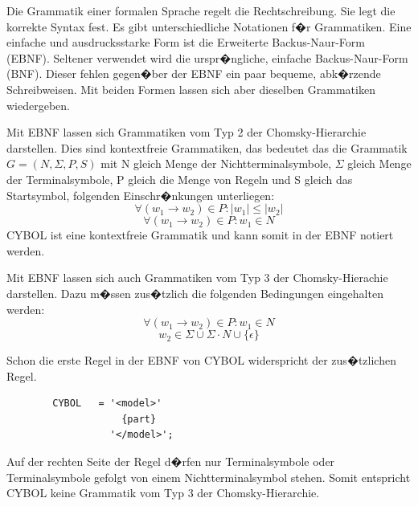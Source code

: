       Die Grammatik einer formalen Sprache regelt die Rechtschreibung. Sie legt die korrekte 
      Syntax fest. Es gibt unterschiedliche Notationen f�r Grammatiken. Eine 
      einfache und ausdrucksstarke Form ist die Erweiterte 
      Backus-Naur-Form (EBNF). Seltener verwendet wird die urspr�ngliche, 
      einfache Backus-Naur-Form (BNF). Dieser fehlen gegen�ber der EBNF ein paar 
      bequeme, abk�rzende Schreibweisen. Mit beiden Formen lassen sich aber dieselben 
      Grammatiken wiedergeben.
      
      Mit EBNF lassen sich Grammatiken vom Typ 2 der Chomsky-Hierarchie darstellen.
      Dies sind kontextfreie Grammatiken, das bedeutet das die Grammatik 
      $G=\left( N, \Sigma, P, S \right)$ mit N gleich Menge der Nichtterminalsymbole,
      $\Sigma$ gleich Menge der Terminalsymbole, P gleich die Menge von Regeln und 
      S gleich das Startsymbol, folgenden Einschr�nkungen unterliegen:
      \begin{displaymath}      
        \forall ( w_1 \rightarrow w_2 ) \in P : \left| w_1 \right| \le \left| w_2 \right|
      \end{displaymath}
      \begin{displaymath}      
        \forall ( w_1 \rightarrow w_2 ) \in P : w_1 \in N
      \end{displaymath}
      CYBOL ist eine kontextfreie Grammatik und kann somit in der EBNF
      notiert werden. 

      Mit EBNF lassen sich auch Grammatiken vom Typ 3 der Chomsky-Hierachie darstellen.
      Dazu m�ssen zus�tzlich
      die folgenden Bedingungen eingehalten werden:
      \begin{displaymath} 
        \forall (w_1 \rightarrow w_2) \in P : w_1 \in N 
      \end{displaymath} 
      \begin{displaymath} 
        w_2 \in \Sigma \cup \Sigma \cdot N \cup \{ \epsilon \}
      \end{displaymath} 
      
      Schon die erste Regel in der EBNF von CYBOL widerspricht der zus�tzlichen Regel.
\begin{verbatim}
        CYBOL   = '<model>' 
                    {part}
                  '</model>';
\end{verbatim}
      Auf der rechten Seite der Regel d�rfen nur Terminalsymbole oder Terminalsymbole gefolgt von einem
      Nichtterminalsymbol stehen. Somit entspricht CYBOL keine Grammatik vom Typ 3 der 
      Chomsky-Hierarchie.
      
